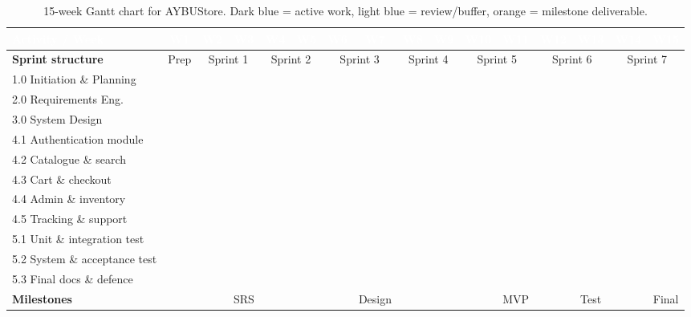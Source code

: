 \documentclass[11pt,a4paper]{article}
\providecommand{\GA}{\cellcolor{ganttActive}}
\providecommand{\GB}{\cellcolor{ganttBuffer}}
\begin{document}
\renewcommand{\arraystretch}{1.15}
\begin{table}[H]
\centering
\scriptsize
\setlength{\tabcolsep}{2pt}
\begin{tabular}{|p{2.8cm}|*{15}{c|}}
\hline
\rowcolor{aybuHeader}
\textcolor{white}{\textbf{Activity / Week}} &
\textcolor{white}{\textbf{W1}} & \textcolor{white}{\textbf{W2}} &
\textcolor{white}{\textbf{W3}} & \textcolor{white}{\textbf{W4}} &
\textcolor{white}{\textbf{W5}} & \textcolor{white}{\textbf{W6}} &
\textcolor{white}{\textbf{W7}} & \textcolor{white}{\textbf{W8}} &
\textcolor{white}{\textbf{W9}} & \textcolor{white}{\textbf{W10}} &
\textcolor{white}{\textbf{W11}} & \textcolor{white}{\textbf{W12}} &
\textcolor{white}{\textbf{W13}} & \textcolor{white}{\textbf{W14}} &
\textcolor{white}{\textbf{W15}} \\ \hline

\rowcolor{ganttSprint}
\textbf{Sprint structure} & Prep & \multicolumn{2}{c|}{Sprint 1} &
\multicolumn{2}{c|}{Sprint 2} & \multicolumn{2}{c|}{Sprint 3} &
\multicolumn{2}{c|}{Sprint 4} & \multicolumn{2}{c|}{Sprint 5} &
\multicolumn{2}{c|}{Sprint 6} & \multicolumn{2}{c|}{Sprint 7} \\ \hline

1.0 Initiation \& Planning & \GA & \GA & & & & & & & & & & & & & \\ \hline
2.0 Requirements Eng. & \GA & \GA & \GA & \GB & \GB & & & & & & & & & & \\ \hline
3.0 System Design & & \GA & \GA & \GA & \GA & \GB & \GB & & & & & & & & \\ \hline
4.1 Authentication module & & \GA & \GA & \GA & \GA & & & & & & & & & & \\ \hline
4.2 Catalogue \& search & & & & \GA & \GA & \GA & \GA & & & & & & & & \\ \hline
4.3 Cart \& checkout & & & & & & \GA & \GA & \GA & \GA & & & & & & \\ \hline
4.4 Admin \& inventory & & & & & & & & \GA & \GA & \GA & \GA & & & & \\ \hline
4.5 Tracking \& support & & & & & & & & & & \GA & \GA & \GA & \GA & & \\ \hline
5.1 Unit \& integration test & & & & \GB & \GB & \GB & \GB & \GB & \GB & \GB & \GA & \GA & \GA & & \\ \hline
5.2 System \& acceptance test & & & & & & & & & & & & & \GA & \GA & \\ \hline
5.3 Final docs \& defence & & & & & & & & & & & & & & \GA & \GA \\ \hline

\rowcolor{ganttMile}
\textbf{Milestones} & & & SRS & & & & Design & & & & MVP & & Test & & Final \\ \hline
\end{tabular}
\caption{15-week Gantt chart for AYBUStore. Dark blue = active work,
light blue = review/buffer, orange = milestone deliverable.}
\label{tab:gantt}
\end{table}
\end{document}
